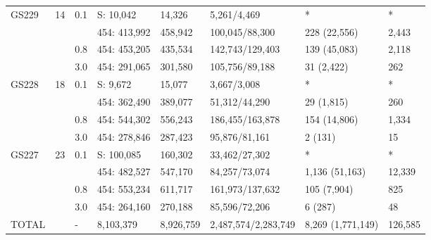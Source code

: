 \begin{table}
\begin{tabularx}{\textwidth}{p{0.6cm}p{0.7cm}p{0.5cm}p{1.8cm}p{1cm}Xp{2.4cm}p{1.4cm}}
GS229 & 14   & 0.1 & S: 10,042   & 14,326  & 5,261/4,469      & *               & *      \\
      &      &     & 454: 413,992    & 458,942 & 100,045/88,300   & 228 (22,556)    & 2,443  \\
      &      & 0.8 & 454: 453,205    & 435,534 & 142,743/129,403  & 139 (45,083)    & 2,118  \\
      &      & 3.0 & 454: 291,065    & 301,580 & 105,756/89,188   & 31 (2,422)      & 262    \\ 
GS228 & 18   & 0.1 & S: 9,672    & 15,077  & 3,667/3,008      & *               & *      \\
      &      &     & 454: 362,490    & 389,077 & 51,312/44,290    & 29 (1,815)      & 260    \\
      &      & 0.8 & 454: 544,302    & 556,243 & 186,455/163,878  & 154 (14,806)    & 1,334  \\
      &      & 3.0 & 454: 278,846    & 287,423 & 95,876/81,161    & 2 (131)         & 15     \\ 
GS227 & 23   & 0.1 & S: 100,085 & 160,302 & 33,462/27,302    & *               & *      \\
      &      &     & 454: 482,527    & 547,170 & 84,257/73,074    & 1,136 (51,163)  & 12,339 \\
      &      & 0.8 & 454: 553,234    & 611,717 & 161,973/137,632  & 105 (7,904)     & 825    \\
      &      & 3.0 & 454: 264,160    & 270,188 & 85,596/72,206    & 6 (287)         & 48     \\ 
TOTAL &      & -   & 8,103,379       & 8,926,759 & 2,487,574/2,283,749 & 8,269 (1,771,149) & 126,585 \\ 
\bottomrule
\end{tabularx}
\end{table}
